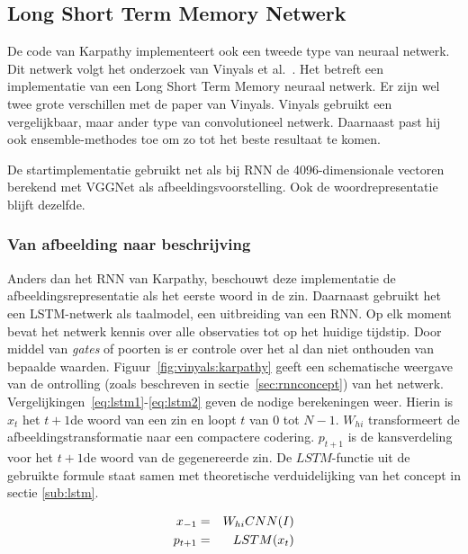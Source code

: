 \subsection{Long Short Term Memory Netwerk}
\label{sec:lstm}
De code van Karpathy implementeert ook een tweede type van neuraal netwerk. Dit netwerk volgt het onderzoek van Vinyals et al.~\cite{Google}. Het betreft een implementatie van een Long Short Term Memory neuraal netwerk. Er zijn wel twee grote verschillen met de paper van Vinyals. Vinyals gebruikt een vergelijkbaar, maar ander type van convolutioneel netwerk. Daarnaast past hij ook ensemble-methodes toe om zo tot het beste resultaat te komen.

De startimplementatie gebruikt net als bij RNN de 4096-dimensionale vectoren berekend met VGGNet als afbeeldingsvoorstelling. Ook de woordrepresentatie blijft dezelfde.

\subsubsection{Van afbeelding naar beschrijving}
Anders dan het RNN van Karpathy, beschouwt deze implementatie de afbeeldingsrepresentatie als het eerste woord in de zin. Daarnaast gebruikt het een LSTM-netwerk als taalmodel, een uitbreiding van een RNN. Op elk moment bevat het netwerk kennis over alle observaties tot op het huidige tijdstip. Door middel van \emph{gates} of poorten is er controle over het al dan niet onthouden van bepaalde waarden. Figuur~\ref{fig:vinyals:karpathy} geeft een schematische weergave van de ontrolling (zoals beschreven in sectie~\ref{sec:rnnconcept}) van het netwerk. Vergelijkingen~\eqref{eq:lstm1}-\eqref{eq:lstm2} geven de nodige berekeningen weer. Hierin is $x_t$ het $t+1$de woord van een zin en loopt $t$ van $0$ tot $N-1$. $W_{hi}$ transformeert de afbeeldingstransformatie naar een compactere codering. $p_{t+1}$ is de kansverdeling voor het $t+1$de woord van de gegenereerde zin. De $LSTM$-functie uit de gebruikte formule staat samen met theoretische verduidelijking van het concept in sectie \ref{sub:lstm}. 

\begin{eqnarray}
\vspace{-3mm}
\label{eq:lstm1}
x_{-1} & = & W_{hi}CNN(I)\\
p_{t+1} & = & LSTM(x_t)
\label{eq:lstm2}
\end{eqnarray}

